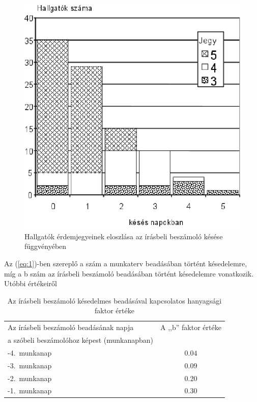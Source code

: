 \documentclass[11pt,a4paper,oneside]{article}
\begin{document}
\begin{figure}[tbh]
  \centering
  \includegraphics[]{fig1.eps}
  \caption{Hallgatók érdemjegyeinek eloszlása az írásbeli beszámoló késése függvényében}
  \label{fig:fig2}
\end{figure}

Az (\ref{eq:1})-ben szereplő a szám a munkaterv beadásában történt
késedelemre, míg a b szám az írásbeli beszámoló beadásában történt
késedelemre vonatkozik.  Utóbbi értékeiről

\begin{table}
  \centering
    \begin{tabular}{|l|c|}
      \hline
      Az írásbeli beszámoló beadásának napja     & A ,,b'' faktor értéke \\
      a szóbeli beszámolóhoz képest (munkanapban) & ~ \\ \hline          
      -4.~munkanap & $0.04$ \\ \hline 
      -3.~munkanap & $0.09$ \\ \hline 
      -2.~munkanap & $0.20$ \\ \hline 
      -1.~munkanap & $0.30$ \\ \hline
      \end{tabular}
    \caption{Az írásbeli beszámoló késedelmes beadásával kapcsolatos hanyagsági faktor értéke}
  \label{tab:hanyagsagi}
\end{table}
\end{document}
